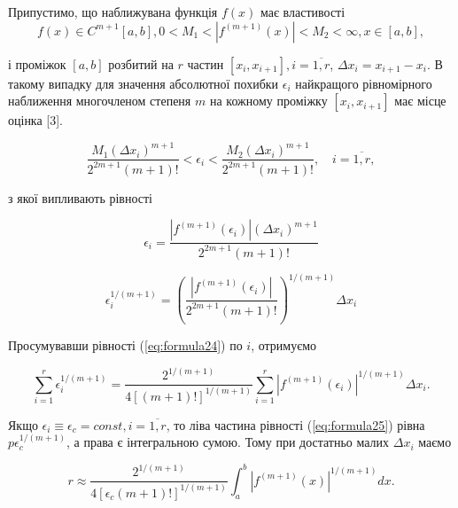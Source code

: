 \documentclass[ukrainian,14pt]{extarticle}
\begin{document}

Припустимо, що наближувана функція $f(x)$ має властивості 
\begin{equation}\label{eq:formula__function_properties}
f(x) \in C^{m+1}[a,b], 0 < M_1 < |f^{(m+1)}(x)| < M_2 < \infty, x \in [a, b],
\end{equation}

і проміжок $[a, b]$ розбитий на $r$ частин $[x_i, x_{i+1}], i=\overline{1, r}$,
$\Delta x_i = x_{i+1} - x_i$. В такому випадку для значення абсолютної похибки $\epsilon_i$ найкращого рівномірного наближення многочленом степеня $m$ на кожному проміжку $[x_i, x_{i+1}]$ має місце оцінка [3].


\begin{equation}\label{eq:formula22}
    \frac {M_1(\Delta x_i)^{m+1}} {2^{2m+1} (m+1)!} < \epsilon_i < \frac {M_2(\Delta x_i)^{m+1}} {2^{2m+1} (m+1)!}, \quad i = \overline{1, r} ,
\end{equation}

з якої випливають рівності

\begin{equation}\label{eq:formula_epsilon_i}
    \epsilon_i = \frac {|f^{(m+1)}(\epsilon_i)|(\Delta x_i)^{m+1}} {2^{2m+1} (m+1)!}
\end{equation}

\begin{equation}\label{eq:formula24}
    \epsilon_i^{1/(m+1)} = \left(\frac {|f^{(m+1)}(\epsilon_i)|} {2^{2m+1} (m+1)!} \right)^{1/(m+1)} \Delta x_i
\end{equation}


Просумувавши рівності (\ref{eq:formula24}) по $i$, отримуємо

\begin{equation}\label{eq:formula25}
  \sum_{i=1}^r \epsilon_i ^{1/(m+1)} = \frac{2^{1/(m+1)}}{4 [(m+1)!]^{1/(m+1)}} \sum_{i=1}^r |f^{(m+1)}(\epsilon_i)|^{1/(m+1)} \Delta x_i . 
\end{equation}

Якщо $\epsilon_i \equiv \epsilon_c = const, i = \overline{1, r}$, то ліва частина рівності (\ref{eq:formula25}) рівна $p \epsilon_c ^{1/(m+1)}$, а права є інтегральною сумою. Тому при достатньо малих $\Delta x_i$ маємо

\begin{equation}\label{eq:formula26}
    r \approx \frac{2^{1/(m+1)}}{4[\epsilon_c (m+1)!]^{1/(m+1)}} \int_a^b |f^{(m+1)}(x)|^{1/(m+1)}dx.
\end{equation}
\end{document}
